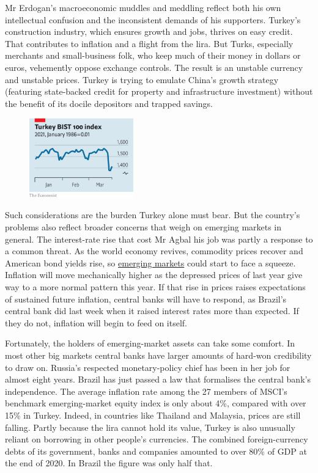 \documentclass{article}
\begin{document}
Mr Erdogan's macroeconomic muddles and meddling reflect both his own intellectual confusion and the inconsistent demands of his supporters. Turkey's construction industry, which ensures growth and jobs, thrives on easy credit. That contributes to inflation and a flight from the lira. But Turks, especially merchants and small-business folk, who keep much of their money in dollars or euros, vehemently oppose exchange controls. The result is an unstable currency and unstable prices. Turkey is trying to emulate China's growth strategy (featuring state-backed credit for property and infrastructure investment) without the benefit of its docile depositors and trapped savings. 

\begin{figure}[h]
\centering
\includegraphics[width=0.4\textwidth]{images/20210327_LDC001.png}
\end{figure}


Such considerations are the burden Turkey alone must bear. But the country's problems also reflect broader concerns that weigh on emerging markets in general. The interest-rate rise that cost Mr Agbal his job was partly a response to a common threat. As the world economy revives, commodity prices recover and American bond yields rise, so \href{/finance-and-economics/2021/03/25/trade-inflows-in-asia-fuel-debate-over-currency-intervention}{emerging markets} could start to face a squeeze. Inflation will move mechanically higher as the depressed prices of last year give way to a more normal pattern this year. If that rise in prices raises expectations of sustained future inflation, central banks will have to respond, as Brazil's central bank did last week when it raised interest rates more than expected. If they do not, inflation will begin to feed on itself. 

Fortunately, the holders of emerging-market assets can take some comfort. In most other big markets central banks have larger amounts of hard-won credibility to draw on. Russia's respected monetary-policy chief has been in her job for almost eight years. Brazil has just passed a law that formalises the central bank's independence. The average inflation rate among the 27 members of MSCI's benchmark emerging-market equity index is only about 4\%, compared with over 15\% in Turkey. Indeed, in countries like Thailand and Malaysia, prices are still falling. Partly because the lira cannot hold its value, Turkey is also unusually reliant on borrowing in other people's currencies. The combined foreign-currency debts of its government, banks and companies amounted to over 80\% of GDP at the end of 2020. In Brazil the figure was only half that. 
\end{document}
